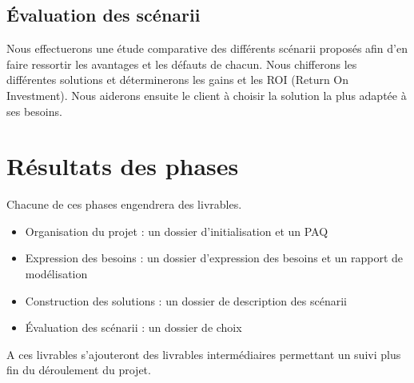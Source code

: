 \subsection{Évaluation des scénarii}

Nous effectuerons une étude comparative des différents scénarii proposés afin d'en faire ressortir les avantages et les défauts de chacun.
Nous chifferons les différentes solutions et déterminerons les gains et les ROI (Return On Investment).
Nous aiderons ensuite le client à choisir la solution la plus adaptée à ses besoins.


\section{Résultats des phases}

Chacune de ces phases engendrera des livrables.

\begin{itemize}
 \item Organisation du projet : un dossier d'initialisation et un PAQ
 \item Expression des besoins : un dossier d'expression des besoins et un rapport de modélisation
 \item Construction des solutions : un dossier de description des scénarii
 \item Évaluation des scénarii : un dossier de choix
\end{itemize}

A ces livrables s'ajouteront des livrables intermédiaires permettant un suivi plus fin du déroulement du projet.
